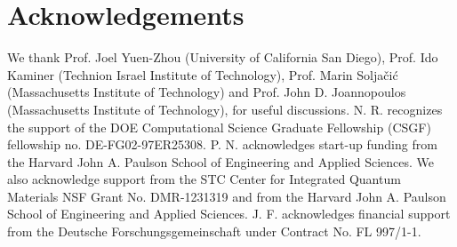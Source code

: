 \documentclass[aps,prl,twocolumn,
	groupedaddress,superscriptaddress,
	amsfonts,amssymb,amsmath,floatfix,
	citeautoscript]{revtex4-1}
\begin{document}



\section{Acknowledgements}
We thank Prof. Joel Yuen-Zhou (University of California San Diego), Prof. Ido Kaminer (Technion Israel Institute of Technology), Prof. Marin Solja\v{c}i\'{c} (Massachusetts Institute of Technology) and Prof. John D. Joannopoulos (Massachusetts Institute of Technology), for useful discussions. N. R. recognizes the support of the DOE Computational Science Graduate Fellowship (CSGF) fellowship no.  DE-FG02-97ER25308. P. N. acknowledges start-up funding from the Harvard John A. Paulson School of Engineering and Applied Sciences.  We also acknowledge support from the STC Center for Integrated Quantum Materials NSF Grant No. DMR-1231319 and from the Harvard John A. Paulson School of Engineering and Applied Sciences. J. F. acknowledges financial support from the Deutsche Forschungsgemeinschaft under Contract No. FL 997/1-1.




\end{document}
